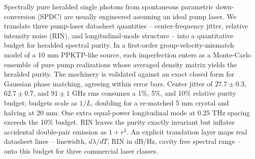 Spectrally pure heralded single photons from spontaneous parametric
down-conversion (SPDC) are usually engineered assuming an ideal pump
laser. We translate three pump-laser datasheet quantities --
center-frequency jitter, relative intensity noise (RIN), and
longitudinal-mode structure -- into a quantitative budget for
heralded spectral purity. In a first-order group-velocity-mismatch
model of a 10 mm PPKTP-like source, each imperfection enters as a
Monte-Carlo ensemble of pure pump realizations whose averaged density
matrix yields the heralded purity. The machinery is validated
against an exact closed form for Gaussian phase matching,
agreeing within error bars. Center jitter of $27.7 \pm 0.3$,
$62.7 \pm 0.7$, and $91 \pm 1$ GHz rms consumes a 1\%, 5\%, and 10\%
relative purity budget; budgets scale as $1/L$, doubling for a
re-matched 5 mm crystal and halving at 20 mm. One extra equal-power
longitudinal mode at 0.25 THz spacing exceeds the 10\% budget.
RIN leaves the purity exactly invariant but inflates accidental
double-pair emission as $1+r^2$. An explicit translation layer maps
real datasheet lines -- linewidth, $d\lambda/dT$, RIN in dB/Hz,
cavity free spectral range -- onto this budget for three commercial
laser classes.
